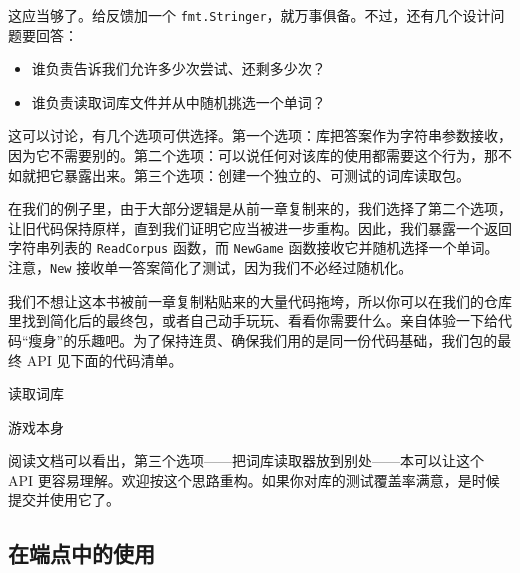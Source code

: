这应当够了。给反馈加一个 \texttt{fmt.Stringer}，就万事俱备。不过，还有几个设计问题要回答：

\begin{itemize}
  \item 谁负责告诉我们允许多少次尝试、还剩多少次？
  \item 谁负责读取词库文件并从中随机挑选一个单词？
\end{itemize}

这可以讨论，有几个选项可供选择。第一个选项：库把答案作为字符串参数接收，因为它不需要别的。第二个选项：可以说任何对该库的使用都需要这个行为，那不如就把它暴露出来。第三个选项：创建一个独立的、可测试的词库读取包。

在我们的例子里，由于大部分逻辑是从前一章复制来的，我们选择了第二个选项，让旧代码保持原样，直到我们证明它应当被进一步重构。因此，我们暴露一个返回字符串列表的 \texttt{ReadCorpus} 函数，而 \texttt{NewGame} 函数接收它并随机选择一个单词。注意，\texttt{New} 接收单一答案简化了测试，因为我们不必经过随机化。

我们不想让这本书被前一章复制粘贴来的大量代码拖垮，所以你可以在我们的仓库里找到简化后的最终包，或者自己动手玩玩、看看你需要什么。亲自体验一下给代码``瘦身''的乐趣吧。为了保持连贯、确保我们用的是同一份代码基础，我们包的最终 API 见下面的代码清单。


\begin{codeannotations}
\item 读取词库
\item 游戏本身
\end{codeannotations}

阅读文档可以看出，第三个选项——把词库读取器放到别处——本可以让这个 API 更容易理解。欢迎按这个思路重构。如果你对库的测试覆盖率满意，是时候提交并使用它了。

\subsection{在端点中的使用}

